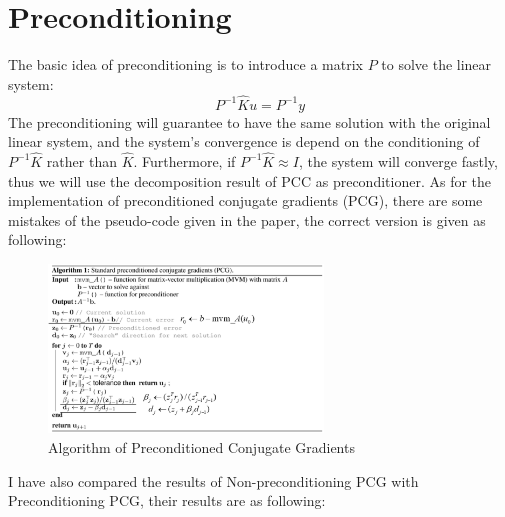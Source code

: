 \documentclass{article} %
\begin{document}
\section{Preconditioning}
The basic idea of preconditioning is to introduce a matrix $P$ to solve the linear system:
\begin{equation}
P^{-1}\hat{K}u=P^{-1}y
\end{equation} 
The preconditioning will guarantee to have the same solution with the original linear system, and the system's convergence is depend on the conditioning of $P^{-1}\hat{K}$ rather than $\hat{K}$. Furthermore, if $P^{-1}\hat{K}\approx I$, the system will converge fastly, thus we will use the decomposition result of PCC as preconditioner. As for the implementation of preconditioned conjugate gradients (PCG), there are some mistakes of the pseudo-code given in the paper, the correct version is given as following:
 \begin{figure}[H]
	\begin{center}
		\includegraphics[width=0.65\textwidth]{PCG}
	\end{center}
	\caption{Algorithm of Preconditioned Conjugate Gradients}
	\label{fig3}
\end{figure}
I have also compared the results of Non-preconditioning PCG with Preconditioning PCG, their results are as following: 
\end{document}

